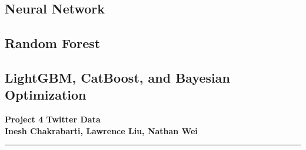 \documentclass[11pt,letterpaper]{article}
\begin{document}
\subsection*{Neural Network}

\subsection*{Random Forest}

\subsection*{LightGBM, CatBoost, and Bayesian Optimization}
\pagebreak
\begin{center}
    \begin{minipage}{10cm}
    	\begin{center}
    	\textbf{\large Project 4 Twitter Data}\\[0.1cm]
        \textbf{Inesh Chakrabarti, Lawrence Liu, Nathan Wei}\\[0.1cm]
    	\end{center}
    \end{minipage}\hfill
\end{center}
\rule{17cm}{0.1mm}



\end{document}
